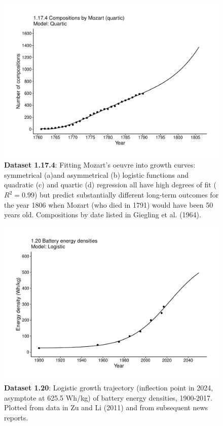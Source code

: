 \documentclass[aps,rmp,preprint,superscriptaddress,10pt,onecolumn]{article}
\begin{document}
\clearpage
\begin{figure}[h]
\includegraphics[width=\textwidth]{output/figs-ggplot/1.17.4.pdf}
\caption{\textbf{Dataset 1.17.4}: Fitting Mozart's oeuvre into growth curves: symmetrical (a)and asymmetrical (b) logistic functions and quadratic (c) and quartic (d) regression all have high degrees of fit ($R^2=0.99$) but predict substantially different long-term outcomes for the year 1806 when Mozart (who died in 1791) would have been 50 years old. Compositions by date listed in Giegling et al. (1964).}
\end{figure}
	
\clearpage
\begin{figure}[h]
\includegraphics[width=\textwidth]{output/figs-ggplot/1.20.pdf}
\caption{\textbf{Dataset 1.20}: Logistic growth trajectory (inflection point in 2024, asymptote at 625.5 Wh/kg) of battery energy densities, 1900-2017. Plotted from data in Zu and Li (2011) and from subsequent news reports. }
\end{figure}
	
\end{document}

